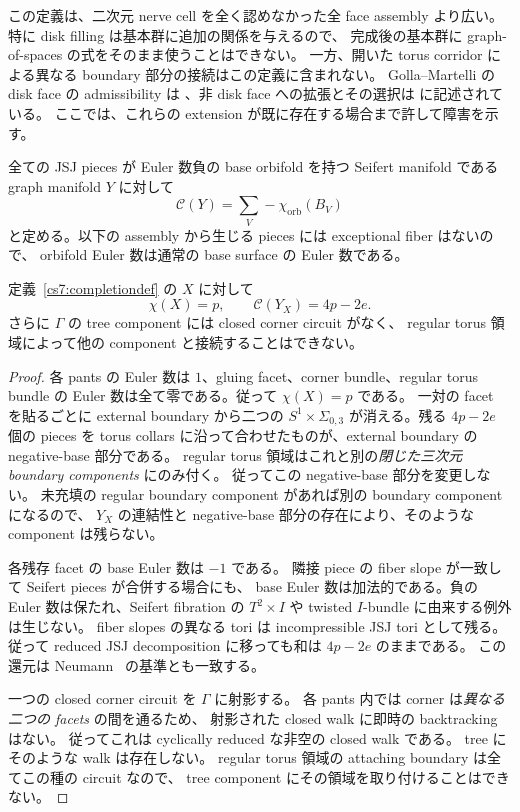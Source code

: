 この定義は、二次元 nerve cell を全く認めなかった全 face assembly より広い。
特に disk filling は基本群に追加の関係を与えるので、
完成後の基本群に graph-of-spaces の式をそのまま使うことはできない。
一方、開いた torus corridor による異なる boundary 部分の接続はこの定義に含まれない。
Golla--Martelli の disk face の admissibility は
\cite[Proposition~4.3]{GollaMartelli}、非 disk face への拡張とその選択は
\cite[Remark~4.9]{GollaMartelli} に記述されている。
ここでは、これらの extension が既に存在する場合まで許して障害を示す。

\begin{definition}
全ての JSJ pieces が Euler 数負の base orbifold を持つ Seifert manifold である
graph manifold $Y$ に対して
\[
 \mathcal C(Y)=\sum_V-\chi_{\mathrm{orb}}(B_V)
\]
と定める。以下の assembly から生じる pieces には exceptional fiber はないので、
orbifold Euler 数は通常の base surface の Euler 数である。
\end{definition}

\begin{lemma}
\label{cs7:complexitylemma}
定義~\ref{cs7:completiondef} の $X$ に対して
\begin{equation}
 \chi(X)=p,\qquad \mathcal C(Y_X)=4p-2e.
 \label{cs7:count}
\end{equation}
さらに $\Gamma$ の tree component には closed corner circuit がなく、
regular torus 領域によって他の component と接続することはできない。
\end{lemma}

\begin{proof}
各 pants の Euler 数は $1$、gluing facet、corner bundle、regular torus bundle の
Euler 数は全て零である。従って $\chi(X)=p$ である。
一対の facet を貼るごとに external boundary から二つの
$S^1\times\Sigma_{0,3}$ が消える。残る $4p-2e$ 個の pieces を
torus collars に沿って合わせたものが、external boundary の negative-base 部分である。
regular torus 領域はこれと別の\emph{閉じた三次元 boundary components} にのみ付く。
従ってこの negative-base 部分を変更しない。
未充填の regular boundary component があれば別の boundary component になるので、
$Y_X$ の連結性と negative-base 部分の存在により、そのような component は残らない。

各残存 facet の base Euler 数は $-1$ である。
隣接 piece の fiber slope が一致して Seifert pieces が合併する場合にも、
base Euler 数は加法的である。負の Euler 数は保たれ、Seifert fibration の
$T^2\times I$ や twisted $I$-bundle に由来する例外は生じない。
fiber slopes の異なる tori は incompressible JSJ tori として残る。
従って reduced JSJ decomposition に移っても和は $4p-2e$ のままである。
この還元は Neumann~\cite[\S5]{Neumann} の基準とも一致する。

一つの closed corner circuit を $\Gamma$ に射影する。
各 pants 内では corner は\emph{異なる二つの facets} の間を通るため、
射影された closed walk に即時の backtracking はない。
従ってこれは cyclically reduced な非空の closed walk である。
tree にそのような walk は存在しない。
regular torus 領域の attaching boundary は全てこの種の circuit なので、
tree component にその領域を取り付けることはできない。
\end{proof}

